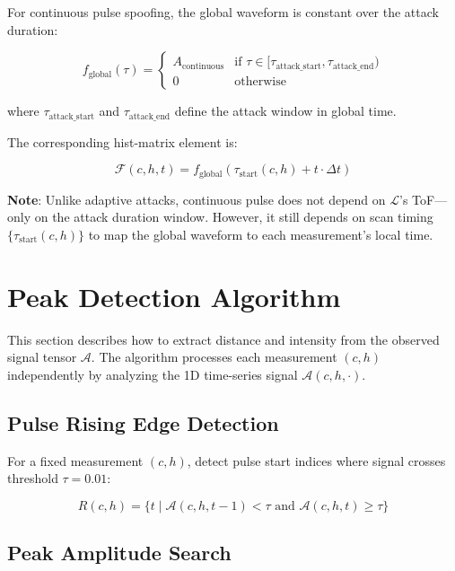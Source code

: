 \documentclass[11pt]{article}
\begin{document}
For continuous pulse spoofing, the global waveform is constant over the attack duration:

\begin{equation}
f_{\text{global}}(\tau) = \begin{cases}
A_{\text{continuous}} & \text{if } \tau \in [\tau_{\text{attack\_start}}, \tau_{\text{attack\_end}}) \\
0 & \text{otherwise}
\end{cases}
\end{equation}

where $\tau_{\text{attack\_start}}$ and $\tau_{\text{attack\_end}}$ define the attack window in global time.

The corresponding hist-matrix element is:

\begin{equation}
\mathcal{F}(c, h, t) = f_{\text{global}}(\tau_{\text{start}}(c, h) + t \cdot \Delta t)
\end{equation}

\textbf{Note}: Unlike adaptive attacks, continuous pulse does not depend on $\bm{\mathcal{L}}$'s ToF—only on the attack duration window. However, it still depends on scan timing $\{\tau_{\text{start}}(c, h)\}$ to map the global waveform to each measurement's local time.

\section{Peak Detection Algorithm}

This section describes how to extract distance and intensity from the observed signal tensor $\bm{\mathcal{A}}$. The algorithm processes each measurement $(c, h)$ independently by analyzing the 1D time-series signal $\mathcal{A}(c, h, \cdot)$.

\subsection{Pulse Rising Edge Detection}

For a fixed measurement $(c, h)$, detect pulse start indices where signal crosses threshold $\tau = 0.01$:

\begin{equation}
R(c, h) = \{t \mid \mathcal{A}(c, h, t-1) < \tau \text{ and } \mathcal{A}(c, h, t) \geq \tau\}
\end{equation}

\subsection{Peak Amplitude Search}
\end{document}
